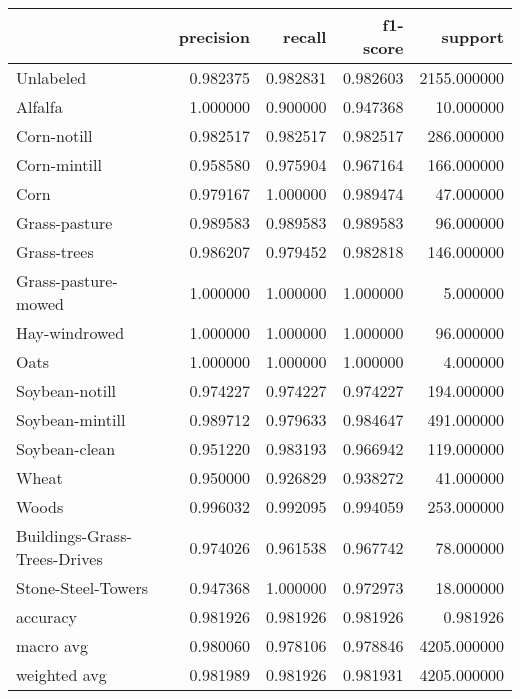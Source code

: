 \begin{tabular}{lrrrr}
\toprule
{} &  precision &    recall &  f1-score &      support \\
\midrule
Unlabeled                    &   0.982375 &  0.982831 &  0.982603 &  2155.000000 \\
Alfalfa                      &   1.000000 &  0.900000 &  0.947368 &    10.000000 \\
Corn-notill                  &   0.982517 &  0.982517 &  0.982517 &   286.000000 \\
Corn-mintill                 &   0.958580 &  0.975904 &  0.967164 &   166.000000 \\
Corn                         &   0.979167 &  1.000000 &  0.989474 &    47.000000 \\
Grass-pasture                &   0.989583 &  0.989583 &  0.989583 &    96.000000 \\
Grass-trees                  &   0.986207 &  0.979452 &  0.982818 &   146.000000 \\
Grass-pasture-mowed          &   1.000000 &  1.000000 &  1.000000 &     5.000000 \\
Hay-windrowed                &   1.000000 &  1.000000 &  1.000000 &    96.000000 \\
Oats                         &   1.000000 &  1.000000 &  1.000000 &     4.000000 \\
Soybean-notill               &   0.974227 &  0.974227 &  0.974227 &   194.000000 \\
Soybean-mintill              &   0.989712 &  0.979633 &  0.984647 &   491.000000 \\
Soybean-clean                &   0.951220 &  0.983193 &  0.966942 &   119.000000 \\
Wheat                        &   0.950000 &  0.926829 &  0.938272 &    41.000000 \\
Woods                        &   0.996032 &  0.992095 &  0.994059 &   253.000000 \\
Buildings-Grass-Trees-Drives &   0.974026 &  0.961538 &  0.967742 &    78.000000 \\
Stone-Steel-Towers           &   0.947368 &  1.000000 &  0.972973 &    18.000000 \\
accuracy                     &   0.981926 &  0.981926 &  0.981926 &     0.981926 \\
macro avg                    &   0.980060 &  0.978106 &  0.978846 &  4205.000000 \\
weighted avg                 &   0.981989 &  0.981926 &  0.981931 &  4205.000000 \\
\bottomrule
\end{tabular}
